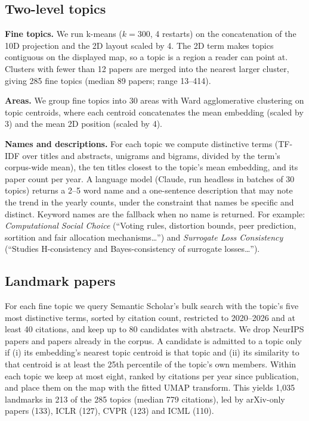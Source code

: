 \documentclass{article}
\begin{document}
\subsection{Two-level topics}
\textbf{Fine topics.} We run k-means ($k=300$, 4 restarts) on the concatenation of the 10D projection and the 2D layout scaled by 4. The 2D term makes topics contiguous on the displayed map, so a topic is a region a reader can point at. Clusters with fewer than 12 papers are merged into the nearest larger cluster, giving 285 fine topics (median 89 papers; range 13--414).

\textbf{Areas.} We group fine topics into 30 areas with Ward agglomerative clustering on topic centroids, where each centroid concatenates the mean embedding (scaled by 3) and the mean 2D position (scaled by 4).

\textbf{Names and descriptions.} For each topic we compute distinctive terms (TF-IDF over titles and abstracts, unigrams and bigrams, divided by the term's corpus-wide mean), the ten titles closest to the topic's mean embedding, and its paper count per year. A language model (Claude, run headless in batches of 30 topics) returns a 2--5 word name and a one-sentence description that may note the trend in the yearly counts, under the constraint that names be specific and distinct. Keyword names are the fallback when no name is returned. For example: \emph{Computational Social Choice} (``Voting rules, distortion bounds, peer prediction, sortition and fair allocation mechanisms\ldots'') and \emph{Surrogate Loss Consistency} (``Studies H-consistency and Bayes-consistency of surrogate losses\ldots'').

\subsection{Landmark papers}
For each fine topic we query Semantic Scholar's bulk search with the topic's five most distinctive terms, sorted by citation count, restricted to 2020--2026 and at least 40 citations, and keep up to 80 candidates with abstracts. We drop NeurIPS papers and papers already in the corpus. A candidate is admitted to a topic only if (i) its embedding's nearest topic centroid is that topic and (ii) its similarity to that centroid is at least the 25th percentile of the topic's own members. Within each topic we keep at most eight, ranked by citations per year since publication, and place them on the map with the fitted UMAP transform. This yields 1{,}035 landmarks in 213 of the 285 topics (median 779 citations), led by arXiv-only papers (133), ICLR (127), CVPR (123) and ICML (110).
\end{document}
